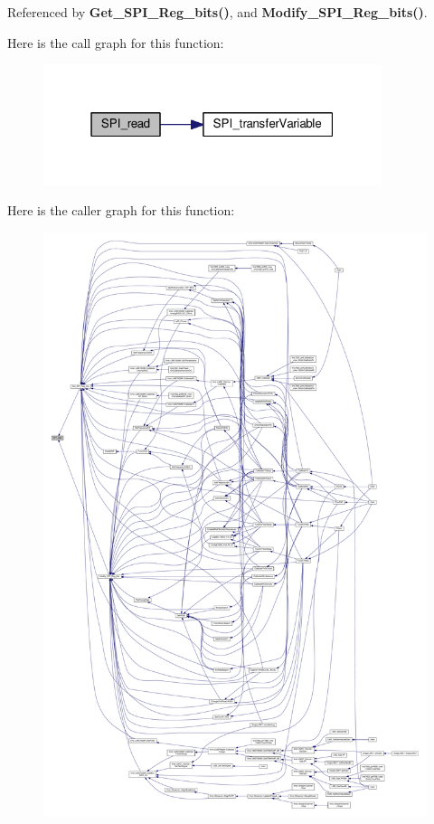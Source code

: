 Referenced by {\bf Get\+\_\+\+S\+P\+I\+\_\+\+Reg\+\_\+bits()}, and {\bf Modify\+\_\+\+S\+P\+I\+\_\+\+Reg\+\_\+bits()}.



Here is the call graph for this function\+:
\nopagebreak
\begin{figure}[H]
\begin{center}
\leavevmode
\includegraphics[width=280pt]{da/d00/spi_8c_ac2c7f9c6724d07d7ec6fd74cd6f50292_cgraph}
\end{center}
\end{figure}




Here is the caller graph for this function\+:
\nopagebreak
\begin{figure}[H]
\begin{center}
\leavevmode
\includegraphics[width=350pt]{da/d00/spi_8c_ac2c7f9c6724d07d7ec6fd74cd6f50292_icgraph}
\end{center}
\end{figure}


